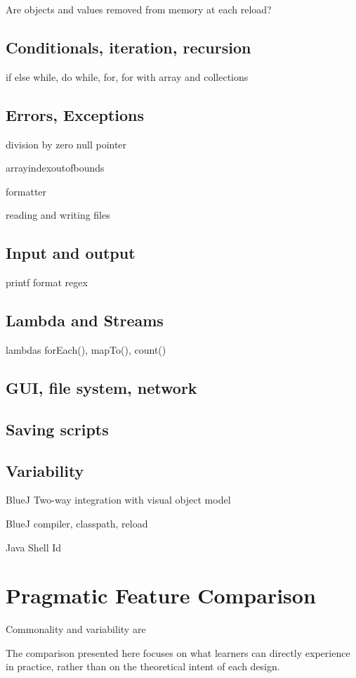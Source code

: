 \documentclass{article}
\begin{document}
Are objects and values removed from memory at each reload?
 

\subsection{Conditionals, iteration, recursion}
if else
while, do while, for, for with array and collections

\subsection{Errors, Exceptions}
division by zero
null pointer

arrayindexoutofbounds

formatter

reading and writing files


\subsection{Input and output}
printf
format
regex

\subsection{Lambda and Streams}
lambdas
forEach(), mapTo(), count()

\subsection{GUI, file system, network}

\subsection{Saving scripts}

\subsection{Variability}
BlueJ Two-way integration with visual object model

BlueJ compiler, classpath, reload

Java Shell Id


\section{Pragmatic Feature Comparison}
Commonality and variability are

The comparison presented here focuses on what learners can directly experience in practice, rather than on the theoretical intent of each design.
\end{document}
